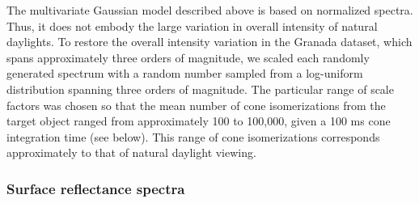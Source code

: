 \documentclass{jov}
\begin{document}
The multivariate Gaussian model described above is based on normalized spectra. 
Thus, it does not embody the large variation in overall intensity of natural daylights.
To restore the overall intensity variation in the Granada dataset, which spans approximately three orders of magnitude, we scaled each randomly generated spectrum with a random number sampled from a log-uniform distribution spanning three orders of magnitude.
The particular range of scale factors was chosen so that the mean number of cone isomerizations from the target object ranged from approximately 100 to 100,000, given a 100 ms cone integration time (see below).
This range of cone isomerizations corresponds approximately to that of natural daylight viewing.

\subsubsection{Surface reflectance spectra}
\end{document}
